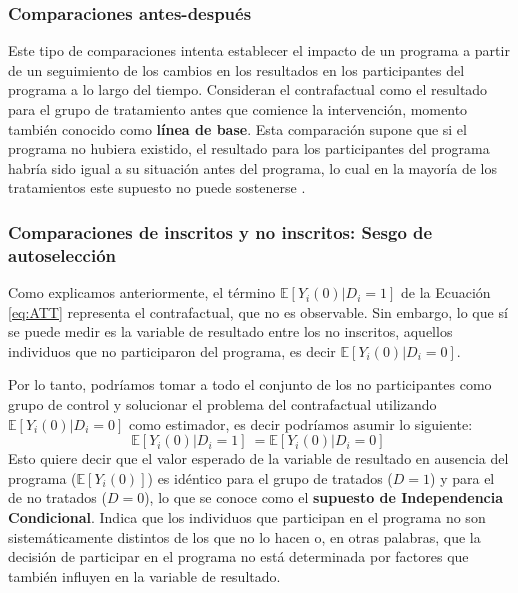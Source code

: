 \documentclass[../../main.tex]{subfiles}
\begin{document}
\subsubsection{Comparaciones antes-después}
Este tipo de comparaciones intenta establecer el impacto de un programa a partir de un seguimiento de los cambios en los resultados en los participantes del programa a lo largo del tiempo. Consideran el contrafactual como el resultado para el grupo de tratamiento antes que comience la intervención, momento también conocido como \textbf{línea de base}. Esta comparación supone que si el programa no hubiera existido, el resultado para los participantes del programa habría sido igual a su situación antes del programa, lo cual en la mayoría de los tratamientos este supuesto no puede sostenerse \cite{gertler-2016}.

\subsubsection{Comparaciones de inscritos y no inscritos: Sesgo de autoselección}
Como explicamos anteriormente, el término \(\mathbb{E} \left[Y_i(0)|D_i=1\right]\) de la Ecuación \ref{eq:ATT} representa el contrafactual, que no es observable. Sin embargo, lo que sí se puede medir es la variable de resultado entre los no inscritos, aquellos individuos que no participaron del programa, es decir \(\mathbb{E} \left[Y_i(0)|D_i=0\right]\).

Por lo tanto, podríamos tomar a todo el conjunto de los no participantes como grupo de control y solucionar el problema del contrafactual utilizando \(\mathbb{E} \left[Y_i(0)|D_i=0\right]\) como estimador, es decir podríamos asumir lo siguiente:  
\begin{equation}
    \mathbb{E} \left[Y_i(0)|D_i=1\right]\ = \mathbb{E} \left[Y_i(0)|D_i=0\right]\
    \label{eq:supuesto-IC}  %
\end{equation}
Esto quiere decir que el valor esperado de la variable de resultado en ausencia del programa (\(\mathbb{E}\left[Y_i(0)\right]\)) es idéntico para el grupo de tratados (\(D = 1\)) y para el de no tratados (\(D = 0\)), lo que se conoce como el \textbf{supuesto de Independencia Condicional}. Indica que los individuos que participan en el programa no son sistemáticamente distintos de los que no lo hacen \cite{bernal} o, en otras palabras, que la decisión de participar en el programa no está determinada por factores que también influyen en la variable de resultado.
\end{document}
